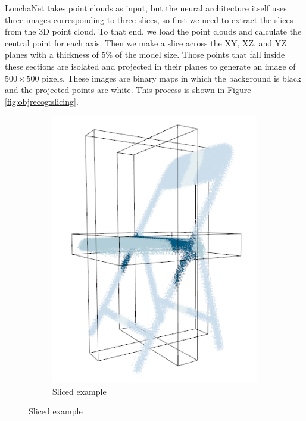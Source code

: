 LonchaNet takes point clouds as input, but the neural architecture itself uses three images corresponding to three slices, so first we need to extract the slices from the 3D point cloud. To that end, we load the point clouds and calculate the central point for each axis. Then we make a slice across the XY, XZ, and YZ planes with a thickness of 5\% of the model size. Those points that fall inside these sections are isolated and projected in their planes to generate an image of $500 \times 500$ pixels. These images are binary maps in which the background is black and the projected points are white. This process is shown in Figure \ref{fig:objrecog:slicing}.

\begin{figure}[!t]	
	\centering
	\begin{subfigure}[t]{0.3\linewidth}
		\centering
		\includegraphics[width=1\linewidth]{Figures/ObjRecog/slices/chairn_1}
        \caption{Sliced example}
        \label{fig:slicing_a}
	\end{subfigure}

\end{figure}

